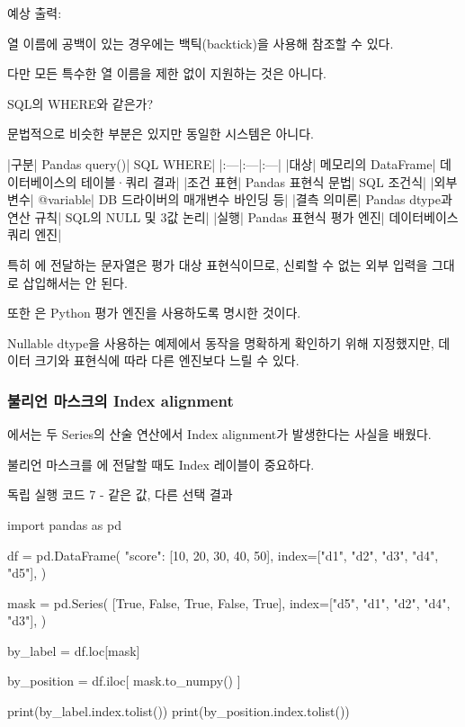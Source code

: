 예상 출력:

\begin{dhkzsh}
[1]
\end{dhkzsh}

열 이름에 공백이 있는 경우에는 백틱(backtick)을 사용해 참조할 수 있다.

다만 모든 특수한 열 이름을 제한 없이 지원하는 것은 아니다.

\begin{dhknote}
\begin{dhksmry}[centered]
SQL의 WHERE와 같은가?
\end{dhksmry}
\end{dhknote}

문법적으로 비슷한 부분은 있지만 동일한 시스템은 아니다.

\begin{dhktable}
|구분|	Pandas query()|	SQL WHERE|
|:---|:---|:---|
|대상|	메모리의 DataFrame|	데이터베이스의 테이블·쿼리 결과|
|조건 표현|	Pandas 표현식 문법|	SQL 조건식|
|외부 변수|	@variable|	DB 드라이버의 매개변수 바인딩 등|
|결측 의미론|	Pandas dtype과 연산 규칙|	SQL의 NULL 및 3값 논리|
|실행|	Pandas 표현식 평가 엔진|	데이터베이스 쿼리 엔진|
\end{dhktable}

특히 에 전달하는 문자열은 평가 대상 표현식이므로, 신뢰할 수 없는 외부 입력을 그대로 삽입해서는 안 된다.

또한 은 Python 평가 엔진을 사용하도록 명시한 것이다.

Nullable dtype을 사용하는 예제에서 동작을 명확하게 확인하기 위해 지정했지만, 데이터 크기와 표현식에 따라 다른 엔진보다 느릴 수 있다.

\subsubsection{불리언 마스크의 Index alignment}

에서는 두 Series의 산술 연산에서 Index alignment가 발생한다는 사실을 배웠다.

불리언 마스크를 에 전달할 때도 Index 레이블이 중요하다.

\begin{dhknote}
\begin{dhksmry}[centered]
독립 실행 코드 7 - 같은 값, 다른 선택 결과
\end{dhksmry}
\end{dhknote}

\begin{dhkcode}
import pandas as pd

df = pd.DataFrame(
    {"score": [10, 20, 30, 40, 50]},
    index=["d1", "d2", "d3", "d4", "d5"],
)

mask = pd.Series(
    [True, False, True, False, True],
    index=["d5", "d1", "d2", "d4", "d3"],
)

by_label = df.loc[mask]

by_position = df.iloc[
    mask.to_numpy()
]

print(by_label.index.tolist())
print(by_position.index.tolist())
\end{dhkcode}

